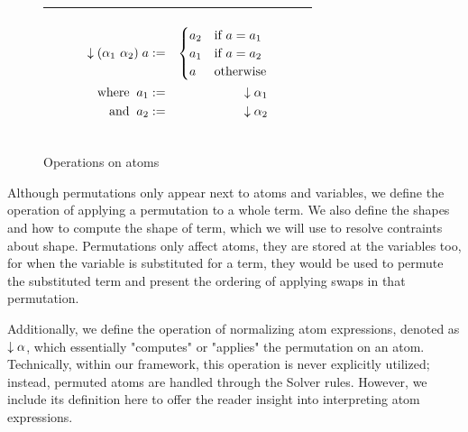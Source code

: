 \documentclass[english, mgr]{iithesis}
\begin{document}
\begin{figure}[htbp]
\begin{tabularx}{\textwidth}{|C|}
    \begin{subfigure}{0.47\textwidth}
      \begin{eqnarray*}
        \downarrow (\alpha_1\ \alpha_2) \; a  & := &
          \begin{cases}
            a_2 & \text{if } a = a_1 \\
            a_1 & \text{if } a = a_2 \\
            a   & \text{otherwise}
          \end{cases} \\
        \text{where }\: a_1 & := & \downarrow \alpha_1 \\
        \text{  and }\: a_2 & := & \downarrow \alpha_2 \\
      \end{eqnarray*}
    \end{subfigure}
  \\ \hline
  \end{tabularx}
  \caption{Operations on atoms}
  \label{fig:terms-shapes-interpretation}
\end{figure}
Although permutations only appear next to atoms and variables,
we define the operation of applying a permutation to a whole term.
We also define the shapes and how to compute the shape of term, which
we will use to resolve contraints about shape.
Permutations only affect atoms, they are stored at the variables too,
for when the variable is substituted for a term, they would be used to permute the
substituted term and present the ordering of applying
swaps in that permutation.

Additionally, we define the operation of normalizing atom expressions,
denoted as $\downarrow \alpha$,
which essentially "computes" or "applies" the permutation on an atom.
Technically, within our framework, this operation is never explicitly utilized;
instead, permuted atoms are handled through the Solver rules.
However, we include its definition here to offer the reader insight into interpreting atom expressions.
\end{document}

